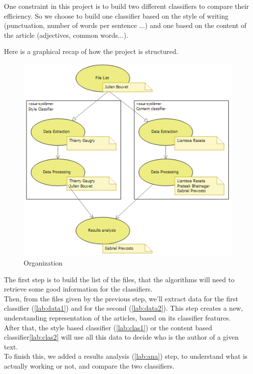 One constraint in this project is to build two different classifiers to compare their efficiency. So we choose to build one classifier based on the style of writing (punctuation, number of words per sentence ...) and one based on the content of the article (adjectives, common words...).

Here is a graphical recap of how the project is structured.
\begin{figure}[h]
	\centering
		\includegraphics{Images/organization.png}
	\caption{Organization}
	\label{fig:organization}
\end{figure}

The first step is to build the list of the files, that the algorithms will need to retrieve some good information for the classifiers.\\
Then, from the files given by the previous step, we'll extract data for the first classifier (\ref{lab:data1}) and for the second (\ref{lab:data2}). This step creates a new, understanding representation of the articles, based on its classifier features.\\
After that, the style based classifier (\ref{lab:clas1}) or the content based classifier\ref{lab:clas2} will use all this data to decide who is the author of a given text.\\
To finish this, we added a results analysis (\ref{lab:ana}) step, to understand what is actually working or not, and compare the two classifiers.
